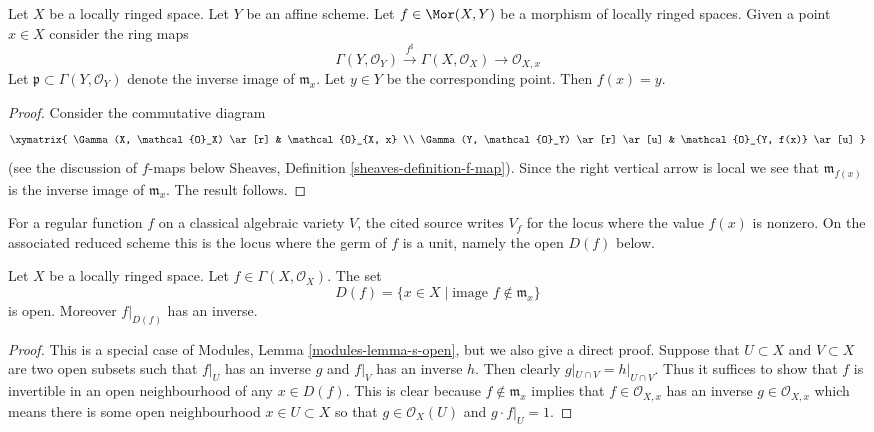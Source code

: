 \begin{lemma}
\label{lemma-morphism-into-affine-where-point-goes}
Let $X$ be a locally ringed space.
Let $Y$ be an affine scheme.
Let $f \in \Mor(X, Y)$ be a morphism
of locally ringed spaces. Given a point $x \in X$
consider the ring maps
$$
\Gamma(Y, \mathcal{O}_Y) \xrightarrow{f^\sharp}
\Gamma(X, \mathcal{O}_X) \to \mathcal{O}_{X, x}
$$
Let $\mathfrak p \subset \Gamma(Y, \mathcal{O}_Y)$ denote
the inverse image of $\mathfrak m_x$. Let $y \in Y$ be the
corresponding point. Then $f(x) = y$.
\end{lemma}

\begin{proof}
Consider the commutative diagram
$$
\xymatrix{
\Gamma(X, \mathcal{O}_X) \ar[r] &
\mathcal{O}_{X, x} \\
\Gamma(Y, \mathcal{O}_Y) \ar[r] \ar[u] &
\mathcal{O}_{Y, f(x)} \ar[u]
}
$$
(see the discussion of $f$-maps below
Sheaves, Definition \ref{sheaves-definition-f-map}).
Since the right vertical arrow is local
we see that $\mathfrak m_{f(x)}$ is the
inverse image of $\mathfrak m_x$. The result
follows.
\end{proof}

\begin{lemma}
\label{lemma-f-open}
\begin{reference}
\cite[Chapter II, \S 3, no. 42, p. 234]{FAC}
\end{reference}
\begin{history}
For a regular function $f$ on a classical algebraic variety $V$, the cited
source writes $V_f$ for the locus where the value $f(x)$ is nonzero. On the
associated reduced scheme this is the locus where the germ of $f$ is a unit,
namely the open $D(f)$ below.
\end{history}
Let $X$ be a locally ringed space.
Let $f \in \Gamma(X, \mathcal{O}_X)$.
The set
$$
D(f) = \{x \in X \mid \text{image }f \not\in \mathfrak m_x\}
$$
is open. Moreover $f|_{D(f)}$ has an inverse.
\end{lemma}

\begin{proof}
This is a special case of Modules, Lemma \ref{modules-lemma-s-open}, but
we also give a direct proof.
Suppose that $U \subset X$ and $V \subset X$ are
two open subsets such that $f|_U$ has an inverse
$g$ and $f|_V$ has an inverse $h$. Then clearly
$g|_{U\cap V} = h|_{U\cap V}$. Thus it suffices
to show that $f$ is invertible in an open neighbourhood
of any $x \in D(f)$. This is clear because
$f \not \in \mathfrak m_x$ implies that $f \in \mathcal{O}_{X, x}$
has an inverse $g \in \mathcal{O}_{X, x}$ which means there
is some open neighbourhood $x \in U \subset X$ so
that $g \in \mathcal{O}_X(U)$ and $g\cdot f|_U = 1$.
\end{proof}

